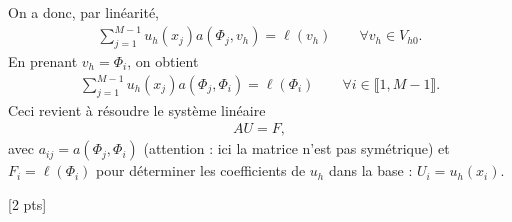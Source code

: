 \documentclass[12pt]{article}
\begin{document}
\begin{cor}
\begin{enumerate}
    On a donc, par lin\'earit\'e,
    \begin{align*}
      \sum_{j=1}^{M-1} u_h(x_j) a(\Phi_j , v_h) = \ell(v_h) \qquad \forall v_h \in V_{h0} .
    \end{align*}
    En prenant $v_h = \Phi_i$, on obtient
    \begin{align*}
      \sum_{j=1}^{M-1} u_h(x_j) a(\Phi_j , \Phi_i) = \ell(\Phi_i) \qquad \forall i \in \llbracket 1 , M-1 \rrbracket .
    \end{align*}
    Ceci revient \`a r\'esoudre le syst\`eme lin\'eaire
    \begin{align*}
      A U = F ,
    \end{align*}
    avec $a_{ij} = a(\Phi_j , \Phi_i)$ (attention : ici la matrice n'est pas sym\'etrique)
    et $F_i = \ell(\Phi_i)$ pour d\'eterminer les coefficients de $u_h$ dans la base :
    $U_i = u_h(x_i)$.

    [2 pts]


  \end{enumerate}
  
\end{cor}
\end{document}

